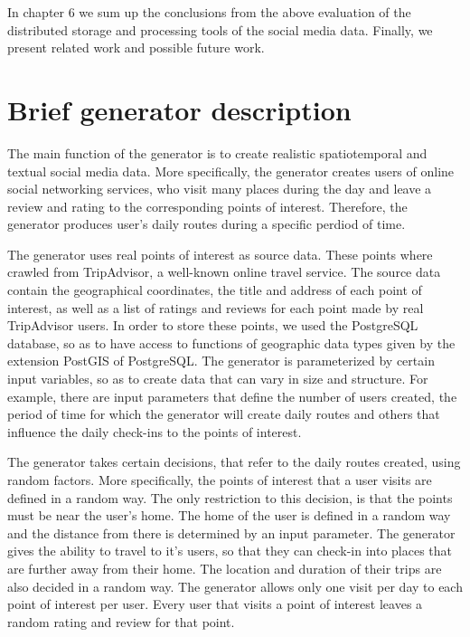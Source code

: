 In chapter 6 we sum up the conclusions from the above evaluation of the distributed storage and processing tools of the social media data. Finally, we 
present related work and possible future work.

\section{Brief generator description}

The main function of the generator is to create realistic spatiotemporal and textual social media data. More specifically, the generator creates users 
of online social networking services, who visit many places during the day and leave a review and rating to the corresponding points of interest. 
Therefore, the generator produces user's daily routes during a specific perdiod of time.

The generator uses real points of interest as source data. These points where crawled from TripAdvisor, a well-known online travel service. 
The source data contain the geographical coordinates, the title and address of each point of interest, as well as a list of ratings and reviews for each point 
made by real TripAdvisor users. In order to store these points, we used the PostgreSQL database, so as to have access to functions of geographic data types 
given by the extension PostGIS of PostgreSQL. The generator is parameterized by certain input variables, so as to create data that can vary in size and structure. 
For example, there are input parameters that define the number of users created, the period of time for which the generator will create daily routes and 
others that influence the daily check-ins to the points of interest. 

The generator takes certain decisions, that refer to the daily routes created, using random factors. More specifically, the points of interest that a user visits 
are defined in a random way. The only restriction to this decision, is that the points must be near the user's home. The home of the user is defined in a random 
way and the distance from there is determined by an input parameter. The generator gives the ability to travel to it's users, so that they can check-in into 
places that are further away from their home. The location and duration of their trips are also decided in a random way. The generator 
allows only one visit per day to each point of interest per user. Every user that visits a point of interest leaves a random rating and review for that point.

